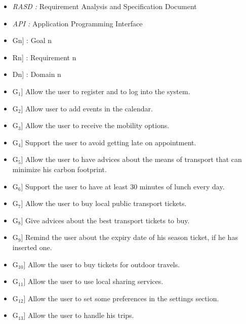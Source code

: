 \begin{itemize}
	\setlength{\leftskip}{0.5cm}
	\item \emph{RASD : }Requirement Analysis and Specification Document
	\item \emph{API : }Application Programming Interface
\end{itemize}

\begin{itemize}
	\setlength{\leftskip}{0.5cm}
	\item \lbrack Gn] : Goal n
	\item \lbrack Rn] : Requirement n
	\item \lbrack Dn] : Domain n
\end{itemize}

\begin{itemize}
	\setlength{\leftskip}{0.5cm}
	\item \lbrack G$_{1}$] Allow the user to register and to log into the system.
	\item \lbrack G$_{2}$] Allow user to add events in the calendar.
	\item \lbrack G$_{3}$] Allow the user to receive the mobility options.
	\item \lbrack G$_{4}$] Support the user to avoid getting late on appointment.
	\item \lbrack G$_{5}$] Allow the user to have advices about the means of transport that can minimize his carbon footprint.
	\item \lbrack G$_{6}$] Support the user to have at least 30 minutes of lunch every day.
	\item \lbrack G$_{7}$] Allow the user to buy local public transport tickets.
	\item \lbrack G$_{8}$] Give advices about the best transport tickets to buy.
	\item \lbrack G$_{9}$] Remind the user about the expiry date of his season ticket, if he has inserted one.
	\item \lbrack G$_{10}$] Allow the user to buy tickets for outdoor travels.
	\item \lbrack G$_{11}$] Allow the user to use local sharing services.
	\item \lbrack G$_{12}$] Allow the user to set some preferences in the settings section.
	\item \lbrack G$_{13}$] Allow the user to handle his trips.
\end{itemize}

